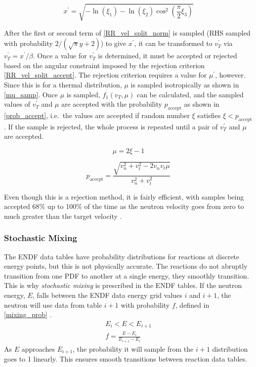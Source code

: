 \begin{equation}
\label{C61_x}
x^\prime =   \sqrt{- \ln( \xi_1) - \ln(\xi_2) \cos^2(\frac{\pi}{2}\xi_3)}
\end{equation}


After the first or second term of \eqref{RR_vel_split_norm} is sampled (RHS sampled with probability $2/(\sqrt{\pi}y+2)$) to give $x^\prime$, it can be transformed to $v_T^\prime$ via $v_T^\prime=x^\prime/\beta$.  Once a value for $v_T^\prime$ is determined, it must be accepted or rejected based on the angular constraint imposed by the rejection criterion \eqref{RR_vel_split_accept}.  The rejection criterion requires a value for $\mu^\prime$, however.  Since this is for a thermal distribution, $\mu$ is sampled isotropically as shown in \eqref{mu_samp}.  Once $\mu$ is sampled, $f_1(v_T,\mu)$ can be calculated, and the sampled values of $v_T^\prime$ and $\mu$ are accepted with the probability $p_\mathrm{accept}$ as shown in \eqref{prob_accept}, i.e.\ the values are accepted if random number $\xi$ satisfies $\xi<p_\mathrm{accept}$.  If the sample is rejected, the whole process is repeated until a pair of $v_T^\prime$ and $\mu$ are accepted.  


\begin{equation}
\label{mu_samp}
\mu = 2\xi - 1 
\end{equation}

\begin{equation}
\label{prob_accept}
p_\mathrm{accept} = \frac{\sqrt{v_n^2+v_t^2-2 v_n v_t \mu}}{v_n^2+v_t^2}
\end{equation}

Even though this is a rejection method, it is fairly efficient, with samples being accepted 68\% up to 100\% of the time as the neutron velocity goes from zero to much greater than the target velocity \cite{mcnp}.

\subsubsection{Stochastic Mixing}

The ENDF data tables have probability distributions for reactions at discrete energy points, but this is not physically accurate.  The reactions do not abruptly transition from one PDF to another at a single energy, they smoothly transition.  This is why \emph{stochastic mixing} is prescribed in the ENDF tables.  If the neutron energy, $E$, falls between the ENDF data energy grid values $i$ and $i+1$, the neutron will use data from table $i+1$ with probability $f$, defined in \eqref{mixing_prob} \cite{openmc}.
%
\begin{equation}
\label{mixing_prob}
\begin{gathered}
E_i < E < E_{i+1} \\
f = \frac{E-E_i}{E_{i+1}-E_i}
\end{gathered}
\end{equation}
%
As $E$ approaches $E_{i+1}$, the probability it will sample from the $i+1$ distribution goes to 1 linearly.  This ensures smooth transitions between reaction data tables.

